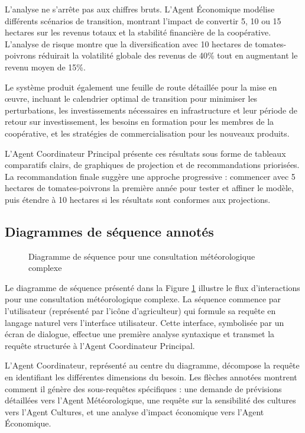 L'analyse ne s'arrête pas aux chiffres bruts. L'Agent Économique modélise différents scénarios de transition, montrant l'impact de convertir 5, 10 ou 15 hectares sur les revenus totaux et la stabilité financière de la coopérative. L'analyse de risque montre que la diversification avec 10 hectares de tomates-poivrons réduirait la volatilité globale des revenus de 40\% tout en augmentant le revenu moyen de 15\%.

Le système produit également une feuille de route détaillée pour la mise en œuvre, incluant le calendrier optimal de transition pour minimiser les perturbations, les investissements nécessaires en infrastructure et leur période de retour sur investissement, les besoins en formation pour les membres de la coopérative, et les stratégies de commercialisation pour les nouveaux produits.

L'Agent Coordinateur Principal présente ces résultats sous forme de tableaux comparatifs clairs, de graphiques de projection et de recommandations priorisées. La recommandation finale suggère une approche progressive : commencer avec 5 hectares de tomates-poivrons la première année pour tester et affiner le modèle, puis étendre à 10 hectares si les résultats sont conformes aux projections.

\subsection{Diagrammes de séquence annotés}

\begin{figure}[h]
\centering
\caption{Diagramme de séquence pour une consultation météorologique complexe}
\label{fig:sequence_weather}
\end{figure}

Le diagramme de séquence présenté dans la Figure \ref{fig:sequence_weather} illustre le flux d'interactions pour une consultation météorologique complexe. La séquence commence par l'utilisateur (représenté par l'icône d'agriculteur) qui formule sa requête en langage naturel vers l'interface utilisateur. Cette interface, symbolisée par un écran de dialogue, effectue une première analyse syntaxique et transmet la requête structurée à l'Agent Coordinateur Principal.

L'Agent Coordinateur, représenté au centre du diagramme, décompose la requête en identifiant les différentes dimensions du besoin. Les flèches annotées montrent comment il génère des sous-requêtes spécifiques : une demande de prévisions détaillées vers l'Agent Météorologique, une requête sur la sensibilité des cultures vers l'Agent Cultures, et une analyse d'impact économique vers l'Agent Économique.

